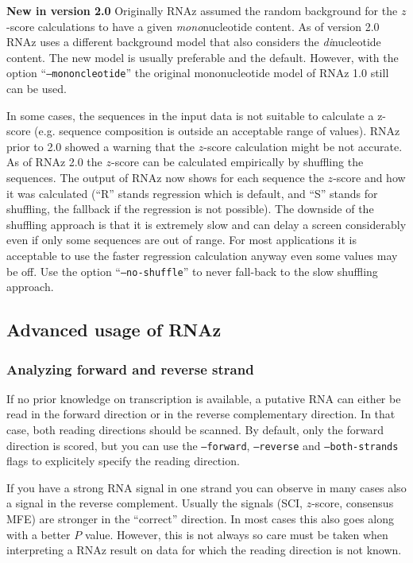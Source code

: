 \documentclass[11pt]{article}
\begin{document}
\textbf{New in version 2.0} Originally RNAz assumed the random
background for the $z$-score calculations to have a given
\emph{mono}nucleotide content. As of version 2.0 RNAz uses a different
background model that also considers the \emph{di}nucleotide
content. The new model is usually preferable and the default. However,
with the option ``\texttt{--mononcleotide}'' the original
mononucleotide model of RNAz 1.0 still can be used.

In some cases, the sequences in the input data is not suitable to
calculate a z-score (e.g. sequence composition is outside an
acceptable range of values). RNAz prior to 2.0 showed a warning that
the $z$-score calculation might be not accurate.  As of RNAz 2.0 the
$z$-score can be calculated empirically by shuffling the
sequences. The output of RNAz now shows for each sequence the
$z$-score and how it was calculated (``R'' stands regression which is
default, and ``S'' stands for shuffling, the fallback if the
regression is not possible). The downside of the shuffling approach is
that it is extremely slow and can delay a screen considerably even if
only some sequences are out of range.  For most applications it is
acceptable to use the faster regression calculation anyway even some
values may be off. Use the option ``\texttt{--no-shuffle}'' to never
fall-back to the slow shuffling approach.






\subsection{Advanced usage of RNAz}

\subsubsection{Analyzing forward and reverse strand}

If no prior knowledge on transcription is available, a putative RNA
can either be read in the forward direction or in the reverse
complementary direction. In that case, both reading directions should
be scanned. By default, only the forward direction is scored, but you
can use the \texttt{--forward}, \texttt{--reverse} and
\texttt{--both-strands} flags to explicitely specify the reading
direction.

If you have a strong RNA signal in one strand you can observe in many
cases also a signal in the reverse complement.  Usually the signals
(SCI, $z$-score, consensus MFE) are stronger in the ``correct''
direction. In most cases this also goes along with a better $P$
value. However, this is not always so care must be taken when
interpreting a RNAz result on data for which the reading direction is
not known.
\end{document}
